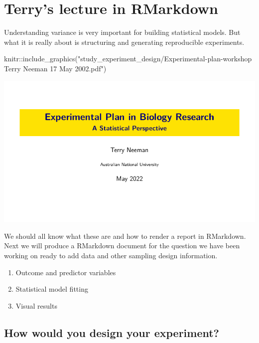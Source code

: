 \documentclass[
]{book}
\newenvironment{Shaded}{\begin{snugshade}}{\end{snugshade}}
\newcommand{\FunctionTok}[1]{\textcolor[rgb]{0.00,0.00,0.00}{#1}}
\newcommand{\NormalTok}[1]{#1}
\newcommand{\SpecialCharTok}[1]{\textcolor[rgb]{0.00,0.00,0.00}{#1}}
\newcommand{\StringTok}[1]{\textcolor[rgb]{0.31,0.60,0.02}{#1}}
\providecommand{\tightlist}{%
  \setlength{\itemsep}{0pt}\setlength{\parskip}{0pt}}
\begin{document}
\hypertarget{terrys-lecture-in-rmarkdown}{%
\section{Terry's lecture in RMarkdown}\label{terrys-lecture-in-rmarkdown}}

Understanding variance is very important for building statistical models. But what it is really about is structuring and generating reproducible experiments.

\begin{Shaded}
\begin{Highlighting}[]
\NormalTok{knitr}\SpecialCharTok{::}\FunctionTok{include\_graphics}\NormalTok{(}\StringTok{"study\_experiment\_design/Experimental{-}plan{-}workshop Terry Neeman 17 May 2002.pdf"}\NormalTok{)}
\end{Highlighting}
\end{Shaded}

\includegraphics{study_experiment_design/Experimental-plan-workshop Terry Neeman 17 May 2002.pdf}

We should all know what these are and how to render a report in RMarkdown. Next we will produce a RMarkdown document for the question we have been working on ready to add data and other sampling design information.

\begin{enumerate}
\def\labelenumi{\arabic{enumi}.}
\tightlist
\item
  Outcome and predictor variables
\item
  Statistical model fitting
\item
  Visual results
\end{enumerate}

\hypertarget{how-would-you-design-your-experiment}{%
\subsection{How would you design your experiment?}\label{how-would-you-design-your-experiment}}
\end{document}
